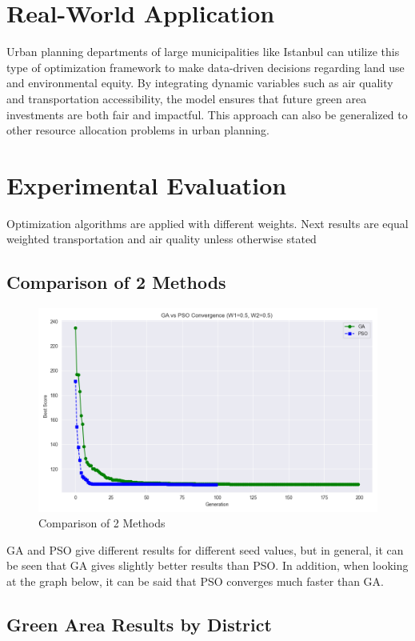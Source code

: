 \documentclass[conference]{IEEEtran}
\begin{document}
\section{Real-World Application}
Urban planning departments of large municipalities like Istanbul can utilize this type of optimization framework to make data-driven decisions regarding land use and environmental equity. By integrating dynamic variables such as air quality and transportation accessibility, the model ensures that future green area investments are both fair and impactful. This approach can also be generalized to other resource allocation problems in urban planning.


\section{Experimental Evaluation}
Optimization algorithms are applied with different weights. Next results are equal weighted transportation and air quality unless otherwise stated
\subsection{Comparison of 2 Methods}
\begin{figure}[H]
    \centering
    \includegraphics[width=0.8\linewidth]{ga_vs_pso_convergence.png}
    \caption{Comparison of 2 Methods}
    \label{fig:compare}
\end{figure}
GA and PSO give different results for different seed values, but in general, it can be seen that GA gives slightly better results than PSO. In addition, when looking at the graph below, it can be said that PSO converges much faster than GA.

\subsection{Green Area Results by District}
\end{document}
